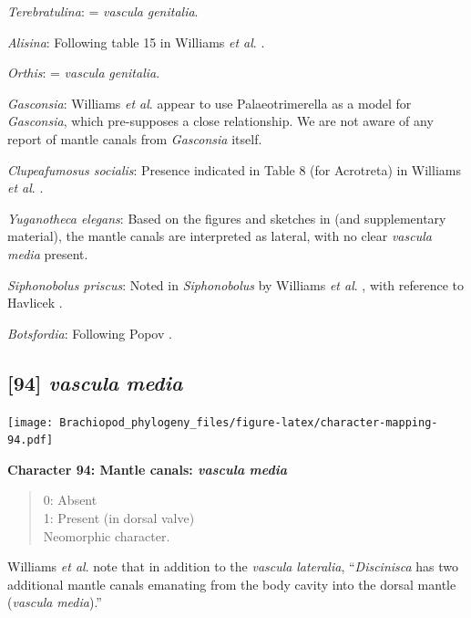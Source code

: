 \documentclass[openany]{book}
\theoremstyle{definition}
\theoremstyle{definition}
\theoremstyle{definition}
\theoremstyle{remark}
\begin{document}
\emph{Terebratulina}: = \emph{vascula} \emph{genitalia}.

\emph{Alisina}: Following table 15 in Williams \emph{et al}.
\citeyearpar{Williams2000BrachiopodaLinguliformea}.

\emph{Orthis}: = \emph{vascula} \emph{genitalia}.

\emph{Gasconsia}: Williams \emph{et al}. \citeyearpar[table
15]{Williams2000BrachiopodaLinguliformea} appear to use Palaeotrimerella
\citep[as drawn in][]{Williams1997BrachiopodaRevised} as a model for
\emph{Gasconsia}, which pre-supposes a close relationship. We are not
aware of any report of mantle canals from \emph{Gasconsia} itself.

\emph{Clupeafumosus socialis}: Presence indicated in Table 8 (for
Acrotreta) in Williams \emph{et al}.
\citeyearpar{Williams2000BrachiopodaLinguliformea}.

\emph{Yuganotheca elegans}: Based on the figures and sketches in
\citet{Zhang2014Anearly} (and supplementary material), the mantle canals
are interpreted as lateral, with no clear \emph{vascula} \emph{media}
present.

\emph{Siphonobolus priscus}: Noted in \emph{Siphonobolus} by Williams
\emph{et al}. \citeyearpar{Williams2000BrachiopodaLinguliformea}, with
reference to Havlicek \citeyearpar{Havlicek1982LingulaceaPaterinacea}.

\emph{Botsfordia}: Following Popov \citeyearpar{Popov1992TheCambrian}.

\hypertarget{vascula-media}{%
\subsection*{\texorpdfstring{{[}94{]} \emph{vascula}
\emph{media}}{{[}94{]} vascula media}}\label{vascula-media}}

\texttt{[image: Brachiopod\_phylogeny\_files/figure-latex/character-mapping-94.pdf]}

\textbf{Character 94: Mantle canals: \emph{vascula} \emph{media}}

\begin{quote}
0: Absent\\
1: Present (in dorsal valve)\\
Neomorphic character.
\end{quote}

Williams \emph{et al}. \citeyearpar{Williams1997BrachiopodaRevised} note
that in addition to the \emph{vascula} \emph{lateralia},
``\emph{Discinisca} has two additional mantle canals emanating from the
body cavity into the dorsal mantle (\emph{vascula} \emph{media}).''
\end{document}
